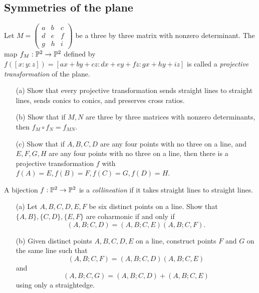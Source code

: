 \subsection{Symmetries of the plane}

\begin{defn} Let $M = \left(\begin{array}{ccc}a & b & c\\ d & e & f\\ g & h & i\end{array}\right)$ be a three by three matrix with nonzero determinant. The map $f_M:\mathbb{P}^2\rightarrow \mathbb{P}^2$ defined by $f([x:y:z]) = [ax+by+cz:dx+ey+fz:gx+hy+iz]$ is called a \emph{projective transformation} of the plane.
\end{defn}

\begin{exer}\label{projective-trans}\hspace{2em}
\begin{itemize}
\item[(a)] Show that every projective transformation sends straight lines to straight lines, sends conics to conics, and preserves cross ratios.

\item[(b)] Show that if $M,N$ are three by three matrices with nonzero determinants, then $f_M\circ f_N = f_{MN}$.

\item[(c)] Show that if $A,B,C,D$ are any four points with no three on a line, and $E,F,G,H$ are any four points with no three on a line, then there is a projective transformation $f$ with $f(A) = E, f(B) = F, f(C) = G, f(D) = H$.
\end{itemize}
\end{exer}

\begin{defn} A bijection $f:\mathbb{P}^2 \rightarrow \mathbb{P}^2$ is a \emph{collineation} if it takes straight lines to straight lines.
\end{defn}

\begin{exer}\label{cr-arithmetic}\hspace{2em}
\begin{itemize}
\item[(a)] Let $A,B,C,D,E,F$ be six distinct points on a line. Show that $\{A,B\},\{C,D\},\{E,F\}$ are coharmonic if and only if
\[
(A,B;C,D) = (A,B;C,E)(A,B;C,F).
\]

\item[(b)] Given distinct points $A,B,C,D,E$ on a line, construct points $F$ and $G$ on the same line such that
\[
(A,B;C,F) = (A,B;C,D)(A,B;C,E)
\]
and
\[
(A,B;C,G) = (A,B;C,D) + (A,B;C,E)
\]
using only a straightedge.
\end{itemize}
\end{exer}

